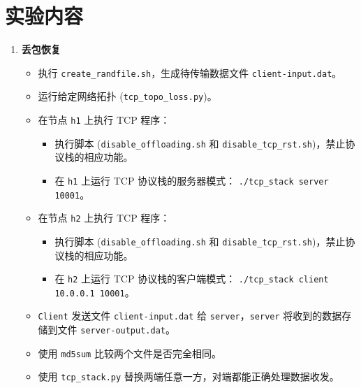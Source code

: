 \documentclass[UTF8]{report}
\begin{document}
\pagestyle{fancy}

\maketitle

\section{实验内容}

\begin{enumerate}

    \item \textbf{丢包恢复}
    \begin{itemize}
        \item 执行 \texttt{create\_randfile.sh}，生成待传输数据文件 \texttt{client-input.dat}。
        \item 运行给定网络拓扑 (\texttt{tcp\_topo\_loss.py})。
        \item 在节点 \texttt{h1} 上执行 TCP 程序：
        \begin{itemize}
            \item 执行脚本 (\texttt{disable\_offloading.sh} 和 \texttt{disable\_tcp\_rst.sh})，禁止协议栈的相应功能。
            \item 在 \texttt{h1} 上运行 TCP 协议栈的服务器模式：
            \texttt{./tcp\_stack server 10001}。
        \end{itemize}
        \item 在节点 \texttt{h2} 上执行 TCP 程序：
        \begin{itemize}
            \item 执行脚本 (\texttt{disable\_offloading.sh} 和 \texttt{disable\_tcp\_rst.sh})，禁止协议栈的相应功能。
            \item 在 \texttt{h2} 上运行 TCP 协议栈的客户端模式：
            \texttt{./tcp\_stack client 10.0.0.1 10001}。
        \end{itemize}
        \item \texttt{Client} 发送文件 \texttt{client-input.dat} 给 \texttt{server}，\texttt{server} 将收到的数据存储到文件 \texttt{server-output.dat}。
        \item 使用 \texttt{md5sum} 比较两个文件是否完全相同。
        \item 使用 \texttt{tcp\_stack.py} 替换两端任意一方，对端都能正确处理数据收发。
    \end{itemize}


\end{enumerate}
\end{document}
